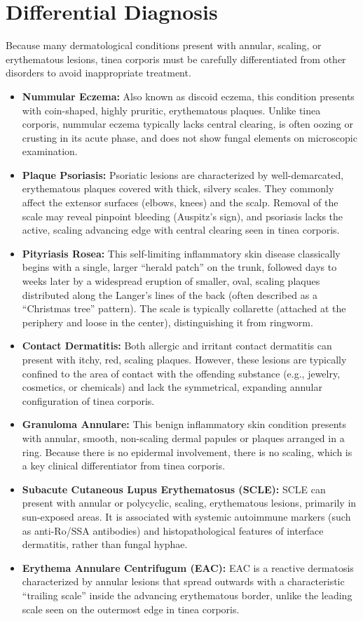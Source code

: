\section*{Differential Diagnosis}
Because many dermatological conditions present with annular, scaling, or erythematous lesions, tinea corporis must be carefully differentiated from other disorders to avoid inappropriate treatment.

\begin{itemize}
    \item \textbf{Nummular Eczema:} Also known as discoid eczema, this condition presents with coin-shaped, highly pruritic, erythematous plaques. Unlike tinea corporis, nummular eczema typically lacks central clearing, is often oozing or crusting in its acute phase, and does not show fungal elements on microscopic examination.
    \item \textbf{Plaque Psoriasis:} Psoriatic lesions are characterized by well-demarcated, erythematous plaques covered with thick, silvery scales. They commonly affect the extensor surfaces (elbows, knees) and the scalp. Removal of the scale may reveal pinpoint bleeding (Auspitz's sign), and psoriasis lacks the active, scaling advancing edge with central clearing seen in tinea corporis.
    \item \textbf{Pityriasis Rosea:} This self-limiting inflammatory skin disease classically begins with a single, larger ``herald patch'' on the trunk, followed days to weeks later by a widespread eruption of smaller, oval, scaling plaques distributed along the Langer's lines of the back (often described as a ``Christmas tree'' pattern). The scale is typically collarette (attached at the periphery and loose in the center), distinguishing it from ringworm.
    \item \textbf{Contact Dermatitis:} Both allergic and irritant contact dermatitis can present with itchy, red, scaling plaques. However, these lesions are typically confined to the area of contact with the offending substance (e.g., jewelry, cosmetics, or chemicals) and lack the symmetrical, expanding annular configuration of tinea corporis.
    \item \textbf{Granuloma Annulare:} This benign inflammatory skin condition presents with annular, smooth, non-scaling dermal papules or plaques arranged in a ring. Because there is no epidermal involvement, there is no scaling, which is a key clinical differentiator from tinea corporis.
    \item \textbf{Subacute Cutaneous Lupus Erythematosus (SCLE):} SCLE can present with annular or polycyclic, scaling, erythematous lesions, primarily in sun-exposed areas. It is associated with systemic autoimmune markers (such as anti-Ro/SSA antibodies) and histopathological features of interface dermatitis, rather than fungal hyphae.
    \item \textbf{Erythema Annulare Centrifugum (EAC):} EAC is a reactive dermatosis characterized by annular lesions that spread outwards with a characteristic ``trailing scale'' inside the advancing erythematous border, unlike the leading scale seen on the outermost edge in tinea corporis.
\end{itemize}

